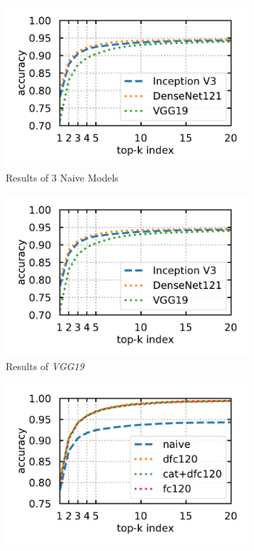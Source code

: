 \documentclass{article}
\begin{document}
\begin{figure}[htb]
	\centering
	\begin{subfigure}{0.48\linewidth}
		\centering
		\includegraphics[width=\linewidth]{pics/Model_naive}
		\caption{Results of $3$ Naive Models}
		\label{fig:all3}
	\end{subfigure} 
	\begin{subfigure}{0.48\linewidth}
		\centering
		\includegraphics[width=\linewidth]{pics/Model_naive}
		\caption{Results of \emph{VGG19}}
		\label{fig:vgg19}
	\end{subfigure} 
	\begin{subfigure}{0.48\linewidth}
		\centering
		\includegraphics[width=\linewidth]{pics/InceptionV3}

\end{subfigure}
\end{figure}
\end{document}
